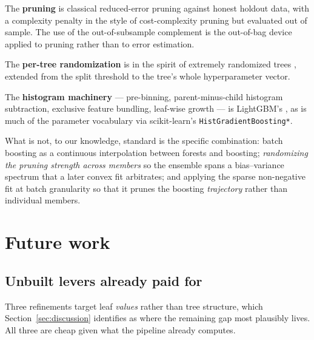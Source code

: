 \documentclass[11pt,a4paper]{article}
\newcommand{\code}[1]{\texttt{\small #1}}
\theoremstyle{definition}
\begin{document}
The \textbf{pruning} is classical reduced-error pruning \cite{quinlan1987rep}
against honest holdout data, with a complexity penalty in the style of
cost-complexity pruning \cite{breiman1984cart} but evaluated out of sample. The
use of the out-of-subsample complement is the out-of-bag device
\cite{breiman1996oob} applied to pruning rather than to error estimation.

The \textbf{per-tree randomization} is in the spirit of extremely randomized
trees \cite{geurts2006et}, extended from the split threshold to the tree's
whole hyperparameter vector.

The \textbf{histogram machinery} --- pre-binning, parent-minus-child histogram
subtraction, exclusive feature bundling, leaf-wise growth --- is LightGBM's
\cite{ke2017lightgbm}, as is much of the parameter vocabulary via
scikit-learn's \code{HistGradientBoosting*}.

What is not, to our knowledge, standard is the specific combination: batch
boosting as a continuous interpolation between forests and boosting;
\emph{randomizing the pruning strength across members} so the ensemble spans a
bias--variance spectrum that a later convex fit arbitrates; and applying the
sparse non-negative fit at batch granularity so that it prunes the boosting
\emph{trajectory} rather than individual members.

\section{Future work}\label{sec:future}

\subsection{Unbuilt levers already paid for}

Three refinements target leaf \emph{values} rather than tree structure, which
Section~\ref{sec:discussion} identifies as where the remaining gap most
plausibly lives. All three are cheap given what the pipeline already computes.
\end{document}
